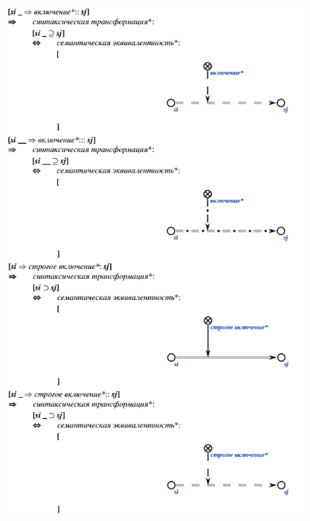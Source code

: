 \newpage


\begin{figure}[h]
	\includegraphics[scale=0.5]{images/intro/scs/sc.s-connectors/examples/example_1.png}
\end{figure}

